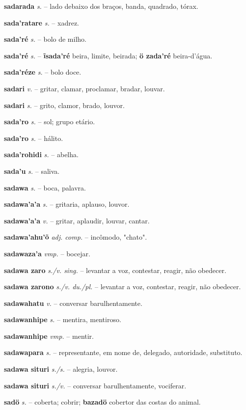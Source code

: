 \textbf{sadarada} \textit{s.} -- lado debaixo dos braços, banda, quadrado, tórax.

\textbf{sada'ratare} \textit{s.} -- xadrez.

\textbf{sada'ré} \textit{s.} -- bolo de milho.

\textbf{sada'ré} \textit{s.} -- \textbf{ĩsada'ré} beira, limite, beirada; \textbf{ö zada'ré} beira-d'água.

\textbf{sada'réze} \textit{s.} -- bolo doce.

\textbf{sadari} \textit{v.} -- gritar, clamar, proclamar, bradar, louvar.

\textbf{sadari} \textit{s.} -- grito, clamor, brado, louvor.

\textbf{sada'ro} \textit{s.} -- sol; grupo etário.

\textbf{sada'ro} \textit{s.} -- hálito.

\textbf{sada'rohidi} \textit{s.} -- abelha.

\textbf{sada'u} \textit{s.} -- saliva.

\textbf{sadawa} \textit{s.} -- boca, palavra.

\textbf{sadawa'a'a} \textit{s.} -- gritaria, aplauso, louvor.

\textbf{sadawa'a'a} \textit{v.} -- gritar, aplaudir, louvar, cantar.

\textbf{sadawa'ahu'õ} \textit{adj. comp.} -- incômodo, "chato".

\textbf{sadawaza'a} \textit{vmp.} -- bocejar.

\textbf{sadawa zaro} \textit{s./v. sing.} -- levantar a voz, contestar, reagir, não obedecer.

\textbf{sadawa zarono} \textit{s./v. du./pl.} -- levantar a voz, contestar, reagir, não obedecer.

\textbf{sadawahatu} \textit{v.} -- conversar barulhentamente.

\textbf{sadawanhipe} \textit{s.} -- mentira, mentiroso.

\textbf{sadawanhipe} \textit{vmp.} -- mentir.

\textbf{sadawapara} \textit{s.} -- representante, em nome de, delegado, autoridade, substituto.

\textbf{sadawa situri} \textit{s./s.} -- alegria, louvor.

\textbf{sadawa situri} \textit{s./v.} -- conversar barulhentamente, vociferar.

\textbf{sadö} \textit{s.} -- coberta; cobrir; \textbf{bazadö} cobertor das costas do animal.


